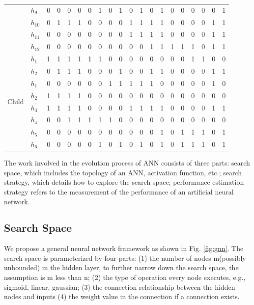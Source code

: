 \documentclass[letterpaper]{IEEEtran}
\begin{document}
\begin{table}[!t]
\begin{adjustbox}{width=0.9\textwidth}
\begin{tabular}{cl|cccc cccc cccc cccc | cc}
				&	$h_9$ & 0  & 0 & 0  & 0  & 0 & 1 & 0 & 1  & 0 & 1	 & 0 & 1  & 0 & 0  & 0 & 0 & 0 & 1\\
				&	$h_{10}$   & 0  & 1 & 1  & 1  & 0 & 0 & 0 & 0  & 1 & 1 & 1 & 1  & 0 & 0  & 0 & 0 & 1 & 1\\
				&	$h_{11}$   & 0  & 0 & 0  & 0  & 0 & 0 & 0 & 0  & 1 & 1 & 1 & 1  & 0 & 0  & 0 & 0 & 1 & 1\\
				&	$h_{12}$   & 0  & 0 & 0  & 0  & 0 & 0 & 0 & 0  & 0 & 0 & 1 & 1  & 1 & 1  & 1 & 0 & 1 & 1\\
			\midrule
			\multirow{8}{*}{Child}	
				   &	$h_1$ & 1  & 1 & 1  & 1  & 1 & 1 & 0 & 0  & 0 & 0 & 0 & 0  & 0 & 0  & 1 & 1 & 0 & 0\\
				&	$h_2$ & 0  & 1 & 1  & 1  & 0 & 0 & 0 & 1  & 0 & 0 & 1 & 1  & 0 & 0  & 0 & 0 & 1 & 1\\
				&	$h_1$ & 0  & 0 & 0  & 0  & 0 & 0 & 1 & 1  & 1 & 1	 & 1 & 0  & 0 & 0  & 0 & 0 & 1 & 0\\
				&	$h_2$ & 1  & 1 & 1  & 1  & 0 & 0 & 0 & 0  & 0 & 0	 & 0 & 0  & 0 & 0  & 0 & 0 & 0 & 0\\
				&	$h_3$ & 1  & 1 & 1  & 1  & 0 & 0 & 0 & 0  & 1 & 1	 & 1 & 1  & 0 & 0  & 0 & 0 & 1 & 1\\
				&	$h_4$ & 0  & 0 & 1  & 1  & 1 & 1 & 1 & 0  & 0 & 0	 & 0 & 0  & 0 & 0  & 0 & 0 & 0 & 0\\
				&	$h_5$ & 0  & 0 & 0  & 0  & 0 & 0 & 0 & 0  & 0 & 0	 & 0 & 1  & 0 & 1  & 1 & 1 & 0 & 1\\
				&	$h_6$ & 0  & 0 & 0  & 0  & 0 & 1 & 0 & 1  & 0 & 1	 & 0 & 1  & 0 & 1  & 1 & 1 & 0 & 1\\
			\bottomrule
			\end{tabular}
		\end{adjustbox}
\end{table}


The work involved in the evolution process of ANN consists of three parts:
search space, which includes the topology of an ANN, activation function, etc.;
search strategy, which details how to explore the search space; performance
estimation strategy refers to the measurement of the performance of
an artificial neural network.

\subsection{Search Space}
We propose a general neural network framework as shown in Fig. \ref{fig:gnn}.
The search space is parameterized by four parts: (1) the number of nodes
m(possibly unbounded) in the hidden layer, to further narrow down the search
space, the assumption is m less than n; (2) the type of operation every node
executes, e.g., sigmoid, linear, gaussian; (3) the connection relationship
between the hidden nodes and inputs (4) the weight value in the connection if a
connection exists.
\end{document}
